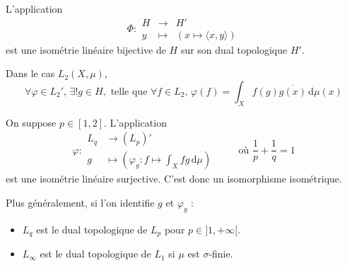 	\begin{theorem}
		L'application
		\[
		\Phi :
		\begin{array}{ccc}
			H &\rightarrow& H' \\
			y &\mapsto& (x \mapsto \langle x, y \rangle)
		\end{array}
		\]
		est une isométrie linéaire bijective de $H$ sur son dual topologique $H'$.
	\end{theorem}

	\begin{example}
		Dans le cas $L_2(X, \mu)$,
		\[ \forall \varphi \in L_2', \, \exists! g \in H, \text{ telle que } \forall f \in L_2, \, \varphi(f) = \int_X f(g) \overline{g(x)} \, \mathrm{d}\mu(x) \]
	\end{example}


	\begin{theorem}
		On suppose $p \in [1, 2]$. L'application
		\[
		\varphi :
		\begin{array}{ll}
			L_q &\rightarrow (L_p)' \\
			g &\mapsto \left( \varphi_g : f \mapsto \int_X f g \, \mathrm{d}\mu \right)
		\end{array}
		\qquad \text{ où } \frac{1}{p} + \frac{1}{q} = 1
		\]
		est une isométrie linéaire surjective. C'est donc un isomorphisme isométrique.
	\end{theorem}


	\begin{remark}
		Plus généralement, si l'on identifie $g$ et $\varphi_g$ :
		\begin{itemize}
			\item $L_q$ est le dual topologique de $L_p$ pour $p \in ]1, +\infty[$.
			\item $L_\infty$ est le dual topologique de $L_1$ si $\mu$ est $\sigma$-finie.
		\end{itemize}
	\end{remark}

